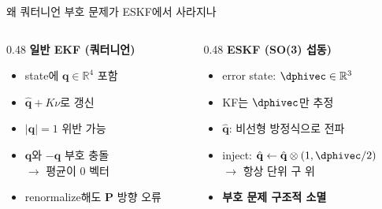 \begin{frame}{왜 쿼터니언 부호 문제가 ESKF에서 사라지나}
  \begin{columns}[T]
    \begin{column}{0.48\textwidth}
      \textbf{일반 EKF (쿼터니언)}
      \begin{itemize}\footnotesize
        \item state에 $\mathbf{q} \in \mathbb{R}^4$ 포함
        \item $\hat{\mathbf{q}} + K\nu$로 갱신
        \item $|\mathbf{q}|=1$ 위반 가능
        \item $\mathbf{q}$와 $-\mathbf{q}$ 부호 충돌\\
              $\rightarrow$ 평균이 0 벡터
        \item renormalize해도 $\bm{P}$ 방향 오류
      \end{itemize}
    \end{column}
    \begin{column}{0.48\textwidth}
      \textbf{ESKF (SO(3) 섭동)}
      \begin{itemize}\footnotesize
        \item error state: $\dphivec \in \mathbb{R}^3$
        \item KF는 $\dphivec$만 추정
        \item $\hat{\mathbf{q}}$: 비선형 방정식으로 전파
        \item inject: $\hat{\mathbf{q}} \leftarrow \hat{\mathbf{q}}\otimes(1,\dphivec/2)$\\
              $\rightarrow$ 항상 단위 구 위
        \item \textbf{부호 문제 구조적 소멸}
      \end{itemize}
    \end{column}
  \end{columns}
\end{frame}

